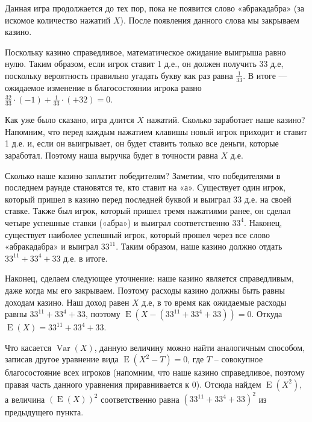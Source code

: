 \documentclass[nobib]{tufte-handout}
\theoremstyle{definition}
\newcounter{problem}
\newenvironment{problem}%
{%
\refstepcounter{problem}%
     \hypertarget{problem:{\theproblem}}{}
     \Writetofile{solution_file}{\protect\hypertarget{soln:\theproblem}{}}
     \begin{myenum}[label=\bfseries\protect\hyperlink{soln:\theproblem}{\theproblem},ref=\theproblem]
     \item%
    }%
    {%
    \end{myenum}}
\DeclareMathOperator{\Var}{Var}
\DeclareMathOperator{\E}{E}
\begin{document}
\begin{problem}
\begin{sol}
\begin{enumerate}
Данная игра продолжается до тех пор, пока не появится слово «абракадабра»
(за искомое количество нажатий $X$). После появления данного слова мы закрываем казино.

Поскольку казино справедливое, математическое ожидание выигрыша равно нулю.
Таким образом, если игрок ставит 1 д.е., он должен получить 33 д.е,
поскольку вероятность правильно угадать букву как раз равна $\frac{1}{33}$.
В итоге — ожидаемое изменение в благосостоянии игрока
равно $\frac{32}{33}\cdot(-1) + \frac{1}{33}\cdot(+32) = 0$.

Как уже было сказано, игра длится $X$ нажатий. Сколько заработает наше казино?
Напомним, что перед каждым нажатием клавишы новый игрок приходит и ставит 1 д.е.
и, если он выигрывает, он будет ставить только все деньги, которые заработал.
Поэтому наша выручка будет в точности равна $X$ д.е.

Сколько наше казино заплатит победителям? Заметим,
что победителями в последнем раунде становятся те, кто ставит на «а».
Существует один игрок, который пришел в казино перед последней буквой
и выиграл $33$ д.е. на своей ставке. Также был игрок,
который пришел тремя нажатиями ранее, он сделал четыре успешные ставки («абра»)
и выиграл соответственно $33^4$. Наконец, существует наиболее успешный игрок,
который прошел через все слово «абракадабра» и выиграл $33^{11}$.
Таким образом, наше казино должно отдать $33^{11}+33^4+33$ д.е. в итоге.

Наконец, сделаем следующее уточнение: наше казино является справедливым,
даже когда мы его закрываем. Поэтому расходы казино должны быть равны доходам казино.
Наш доход равен $X$ д.е, в то время как ожидаемые расходы равны $33^{11}+33^4+33$,
поэтому $\E (X - (33^{11}+33^4+33)) = 0$. Откуда $\E(X) = 33^{11}+33^4+33$.

Что касается $\Var(X)$, данную величину можно найти аналогичным способом,
записав другое уравнение вида $\E(X^2 - T)=0$, где $T$ – совокупное
благосостояние всех игроков (напомним, что наше казино справедливое,
поэтому правая часть данного уравнения приравнивается к $0$).
Отсюда найдем $\E(X^2)$, а величина $(\E(X))^2$
соответственно равна $(33^{11}+33^4+33)^2$ из предыдущего пункта.
\end{enumerate}
\end{sol}

\end{problem}
\end{document}
